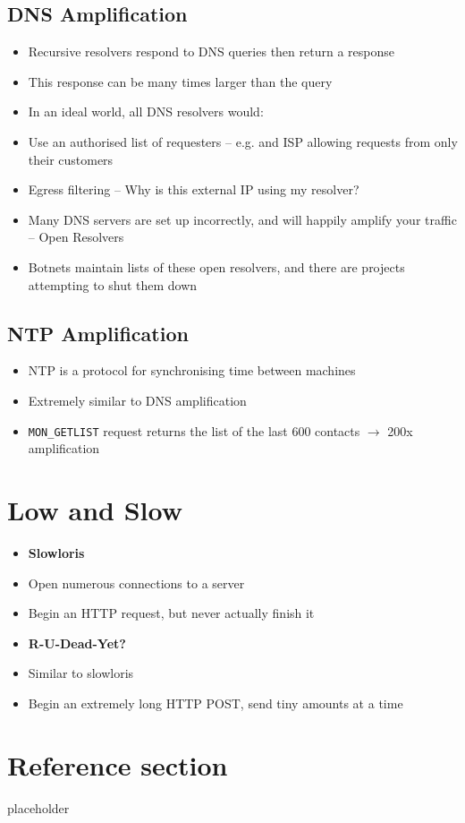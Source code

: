 \documentclass{article}
\begin{document}
\pagebreak

\subsection{DNS Amplification}
\begin{itemize}
  \item Recursive resolvers respond to DNS queries then return a response 
  \item This response can be many times larger than the query
  \item In an ideal world, all DNS resolvers would: 
  \item Use an authorised list of requesters – e.g. and ISP allowing requests from only their customers 
  \item Egress filtering – Why is this external IP using my resolver? 
  \item Many DNS servers are set up incorrectly, and will happily amplify your traffic – Open Resolvers 
  \item Botnets maintain lists of these open resolvers, and there are projects attempting to shut them down
\end{itemize}

\subsection{NTP Amplification}
\begin{itemize}
  \item NTP is a protocol for synchronising time between machines 
  \item Extremely similar to DNS amplification 
  \item \verb!MON_GETLIST! request returns the list of the last 600 contacts $\rightarrow$ 200x amplification
\end{itemize}

\section{Low and Slow}
\begin{itemize}
  \item \textbf{Slowloris} 
  \item Open numerous connections to a server 
  \item Begin an HTTP request, but never actually finish it 
  \item \textbf{R-U-Dead-Yet?} 
  \item Similar to slowloris 
  \item Begin an extremely long HTTP POST, send tiny amounts at a time
\end{itemize}

\pagebreak
\section*{Reference section} \label{sec:reference}
\begin{description}
	\item[placeholder] \hfill \\
\end{description}
\end{document}
